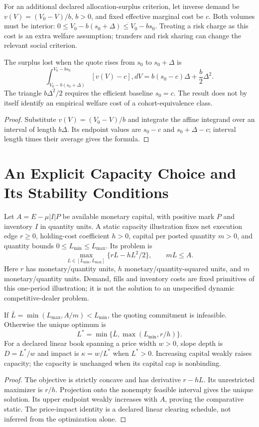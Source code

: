 For an additional declared allocation-surplus criterion, let inverse demand be $v(V)=(V_0-V)/b$, $b>0$, and fixed effective marginal cost be $c$. Both volumes must be interior: $0\le V_0-b(s_0+\Delta)\le V_0-bs_0$. Treating a risk charge as this cost is an extra welfare assumption; transfers and risk sharing can change the relevant social criterion.
\begin{proposition}
The surplus lost when the quote rises from $s_0$ to $s_0+\Delta$ is
\[
\int_{V_0-b(s_0+\Delta)}^{V_0-bs_0}[v(V)-c],dV
=b(s_0-c)\Delta+\frac b2\Delta^2.
\]
The triangle $b\Delta^2/2$ requires the efficient baseline $s_0=c$. The result does not by itself identify an empirical welfare cost of a cohort-equivalence class.
\end{proposition}
\begin{proof}
Substitute $v(V)=(V_0-V)/b$ and integrate the affine integrand over an interval of length $b\Delta$. Its endpoint values are $s_0-c$ and $s_0+\Delta-c$; interval length times their average gives the formula.
\end{proof}

\section{An Explicit Capacity Choice and Its Stability Conditions}
Let $A=E-\mu|I|P$ be available monetary capital, with positive mark $P$ and inventory $I$ in quantity units. A static capacity illustration fixes net execution edge $r\ge0$, holding-cost coefficient $h>0$, capital per posted quantity $m>0$, and quantity bounds $0\le L_{\min}\le L_{\max}$. Its problem is
\[
\max_{L\in[L_{\min},L_{\max}]}\{rL-hL^2/2\},\qquad mL\le A.
\]
Here $r$ has monetary/quantity units, $h$ monetary/quantity-squared units, and $m$ monetary/quantity units. Demand, fills and inventory costs are fixed primitives of this one-period illustration; it is not the solution to an unspecified dynamic competitive-dealer problem.
\begin{proposition}
If $\bar L=\min(L_{\max},A/m)<L_{\min}$, the quoting commitment is infeasible. Otherwise the unique optimum is
\[
L^*=\min\{\bar L,\max(L_{\min},r/h)\}.
\]
For a declared linear book spanning a price width $w>0$, slope depth is $D=L^*/w$ and impact is $\kappa=w/L^*$ when $L^*>0$. Increasing capital weakly raises capacity; the capacity is unchanged when its capital cap is nonbinding.
\end{proposition}
\begin{proof}
The objective is strictly concave and has derivative $r-hL$. Its unrestricted maximizer is $r/h$. Projection onto the nonempty feasible interval gives the unique solution. Its upper endpoint weakly increases with $A$, proving the comparative static. The price-impact identity is a declared linear clearing schedule, not inferred from the optimization alone.
\end{proof}

